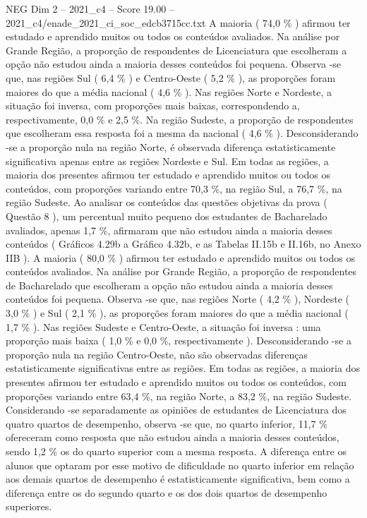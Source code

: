 \begin{textsample}{NEG Dim 2 – 2021\_c4 – Score 19.00 – 2021\_c4/enade\_2021\_ci\_soc\_edcb3715cc.txt}
A maioria ( 74,0 \% ) afirmou ter estudado e aprendido muitos ou todos os conteúdos avaliados.
Na análise por Grande Região, a proporção de respondentes de Licenciatura que escolheram a opção não estudou ainda a maioria desses conteúdos foi pequena.
Observa -se que, nas regiões Sul ( 6,4 \% ) e Centro-Oeste ( 5,2 \% ), as proporções foram maiores do que a média nacional ( 4,6 \% ).
Nas regiões Norte e Nordeste, a situação foi inversa, com proporções mais baixas, correspondendo a, respectivamente, 0,0 \% e 2,5 \%.
Na região Sudeste, a proporção de respondentes que escolheram essa resposta foi a mesma da nacional ( 4,6 \% ).
Desconsiderando -se a proporção nula na região Norte, é observada diferença estatisticamente significativa apenas entre as regiões Nordeste e Sul.
Em todas as regiões, a maioria dos presentes afirmou ter estudado e aprendido muitos ou todos os conteúdos, com proporções variando entre 70,3 \%, na região Sul, a 76,7 \%, na região Sudeste.
Ao analisar os conteúdos das questões objetivas da prova ( Questão 8 ), um percentual muito pequeno dos estudantes de Bacharelado avaliados, apenas 1,7 \%, afirmaram que não estudou ainda a maioria desses conteúdos ( Gráficos 4.29b a Gráfico 4.32b, e as Tabelas II.15b e II.16b, no Anexo IIB ).
A maioria ( 80,0 \% ) afirmou ter estudado e aprendido muitos ou todos os conteúdos avaliados.
Na análise por Grande Região, a proporção de respondentes de Bacharelado que escolheram a opção não estudou ainda a maioria desses conteúdos foi pequena.
Observa -se que, nas regiões Norte ( 4,2 \% ), Nordeste ( 3,0 \% ) e Sul ( 2,1 \% ), as proporções foram maiores do que a média nacional ( 1,7 \% ).
Nas regiões Sudeste e Centro-Oeste, a situação foi inversa : uma proporção mais baixa ( 1,0 \% e 0,0 \%, respectivamente ).
Desconsiderando -se a proporção nula na região Centro-Oeste, não são observadas diferenças estatisticamente significativas entre as regiões.
Em todas as regiões, a maioria dos presentes afirmou ter estudado e aprendido muitos ou todos os conteúdos, com proporções variando entre 63,4 \%, na região Norte, a 83,2 \%, na região Sudeste.
Considerando -se separadamente as opiniões de estudantes de Licenciatura dos quatro quartos de desempenho, observa -se que, no quarto inferior, 11,7 \% ofereceram como resposta que não estudou ainda a maioria desses conteúdos, sendo 1,2 \% os do quarto superior com a mesma resposta.
A diferença entre os alunos que optaram por esse motivo de dificuldade no quarto inferior em relação aos demais quartos de desempenho é estatisticamente significativa, bem como a diferença entre os do segundo quarto e os dos dois quartos de desempenho superiores.

\end{textsample}
